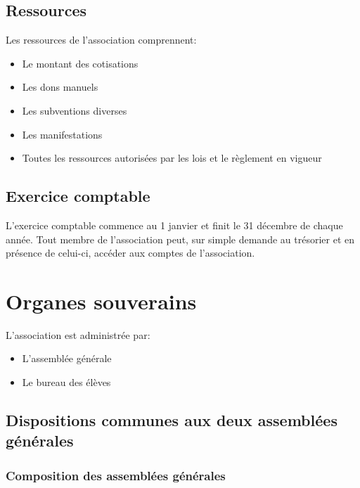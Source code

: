 \documentclass{article}
\begin{document}
		\subsection{Ressources}
\label{sub:ressources}
			Les ressources de l’association comprennent:
			\begin{itemize}
				\item Le montant des cotisations
				\item Les dons manuels
				\item Les subventions diverses
				\item Les manifestations
				\item Toutes les ressources autorisées par les lois et le
					règlement en vigueur
			\end{itemize}

		\subsection{Exercice comptable}
\label{sub:exercice_comptable}
			L’exercice comptable commence au 1 janvier et finit le 31
			décembre de chaque année. Tout membre de l’association peut, sur
			simple demande au trésorier et en présence de celui-ci, accéder aux
			comptes de l’association.

	\section{Organes souverains}
\label{sec:organes_souverains}
		L’association est administrée par:
		\begin{itemize}
			\item L’assemblée générale
			\item Le bureau des élèves
		\end{itemize}

		\subsection{Dispositions communes aux deux assemblées générales}
\label{sub:dispositions_communes_aux_deux_assemblees_generales}
		
			\subsubsection{Composition des assemblées générales}
\label{ssub:composition_des_assemblees_generales}
			
\end{document}

